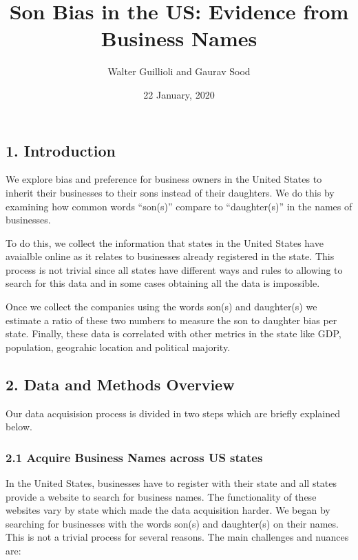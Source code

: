 \documentclass[]{article}
\title{Son Bias in the US: Evidence from Business Names}
\author{Walter Guillioli and Gaurav Sood}
\date{22 January, 2020}
\begin{document}
\maketitle

\hypertarget{introduction}{%
\subsection{1. Introduction}\label{introduction}}

We explore bias and preference for business owners in the United States
to inherit their businesses to their sons instead of their daughters. We
do this by examining how common words ``son(s)'' compare to
``daughter(s)'' in the names of businesses.

To do this, we collect the information that states in the United States
have avaialble online as it relates to businesses already registered in
the state. This process is not trivial since all states have different
ways and rules to allowing to search for this data and in some cases
obtaining all the data is impossible.

Once we collect the companies using the words son(s) and daughter(s) we
estimate a ratio of these two numbers to measure the son to daughter
bias per state. Finally, these data is correlated with other metrics in
the state like GDP, population, geograhic location and political
majority.

\hypertarget{data-and-methods-overview}{%
\subsection{2. Data and Methods
Overview}\label{data-and-methods-overview}}

Our data acquisision process is divided in two steps which are briefly
explained below.

\hypertarget{acquire-business-names-across-us-states}{%
\subsubsection{2.1 Acquire Business Names across US
states}\label{acquire-business-names-across-us-states}}

In the United States, businesses have to register with their state and
all states provide a website to search for business names. The
functionality of these websites vary by state which made the data
acquisition harder. We began by searching for businesses with the words
son(s) and daughter(s) on their names. This is not a trivial process for
several reasons. The main challenges and nuances are:
\end{document}
